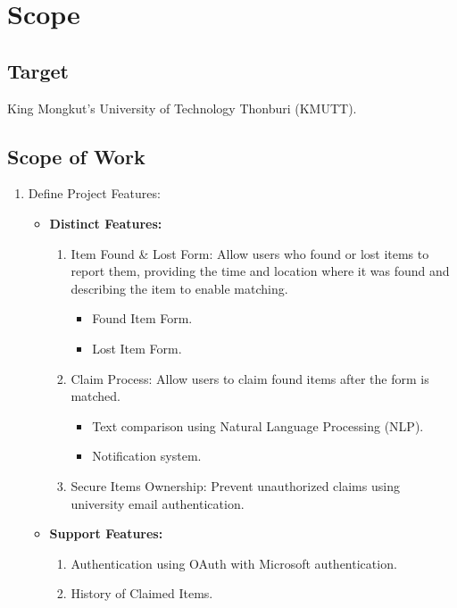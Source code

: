 \section{Scope}
\subsection{Target}
King Mongkut's University of Technology Thonburi (KMUTT).

\subsection{Scope of Work}
\begin{enumerate}
    \item Define Project Features:
    \begin{itemize}
        \item \textbf{Distinct Features:}
        \begin{enumerate}
            \item Item Found \& Lost Form: Allow users who found or lost items to report them, providing the time and location where it was found and describing the item to enable matching.
                \begin{itemize}
                    \item Found Item Form.
                    \item Lost Item Form.
                \end{itemize}
            \item Claim Process: Allow users to claim found items after the form is matched.
                \begin{itemize}
                    \item Text comparison using Natural Language Processing (NLP).
                    \item Notification system.
                \end{itemize}
            \item Secure Items Ownership: Prevent unauthorized claims using university email authentication.
        \end{enumerate}
        \item \textbf{Support Features:}
        \begin{enumerate}
            \item Authentication using OAuth with Microsoft authentication.
            \item History of Claimed Items.
        \end{enumerate}

\end{itemize}
\end{enumerate}
